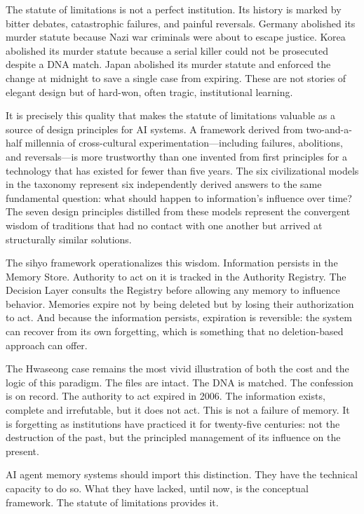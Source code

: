 \documentclass[12pt]{article}
\begin{document}
The statute of limitations is not a perfect institution. Its history is marked by bitter debates, catastrophic failures, and painful reversals. Germany abolished its murder statute because Nazi war criminals were about to escape justice. Korea abolished its murder statute because a serial killer could not be prosecuted despite a DNA match. Japan abolished its murder statute and enforced the change at midnight to save a single case from expiring. These are not stories of elegant design but of hard-won, often tragic, institutional learning.

It is precisely this quality that makes the statute of limitations valuable as a source of design principles for AI systems. A framework derived from two-and-a-half millennia of cross-cultural experimentation---including failures, abolitions, and reversals---is more trustworthy than one invented from first principles for a technology that has existed for fewer than five years. The six civilizational models in the taxonomy represent six independently derived answers to the same fundamental question: what should happen to information's influence over time? The seven design principles distilled from these models represent the convergent wisdom of traditions that had no contact with one another but arrived at structurally similar solutions.

The sihyo framework operationalizes this wisdom. Information persists in the Memory Store. Authority to act on it is tracked in the Authority Registry. The Decision Layer consults the Registry before allowing any memory to influence behavior. Memories expire not by being deleted but by losing their authorization to act. And because the information persists, expiration is reversible: the system can recover from its own forgetting, which is something that no deletion-based approach can offer.

The Hwaseong case remains the most vivid illustration of both the cost and the logic of this paradigm. The files are intact. The DNA is matched. The confession is on record. The authority to act expired in 2006. The information exists, complete and irrefutable, but it does not act. This is not a failure of memory. It is forgetting as institutions have practiced it for twenty-five centuries: not the destruction of the past, but the principled management of its influence on the present.

AI agent memory systems should import this distinction. They have the technical capacity to do so. What they have lacked, until now, is the conceptual framework. The statute of limitations provides it.
\end{document}
